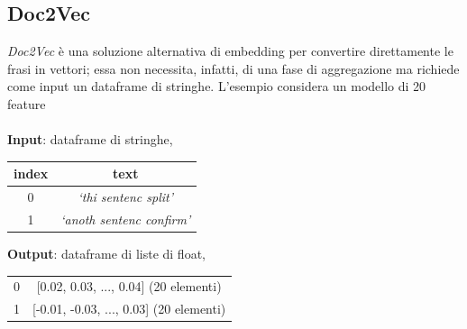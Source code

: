 \documentclass[12pt]{report}
\theoremstyle{definition}
\begin{document}
\subsection{Doc2Vec}
\textit{Doc2Vec} è una soluzione alternativa di embedding per convertire direttamente le frasi in vettori; essa non necessita, infatti, di una fase di aggregazione ma richiede come input un dataframe di stringhe.
L'esempio considera un modello di 20 feature 
\\
\\
\textbf{Input}: dataframe di stringhe,
\begin{center}
    \begin{tabular}{|c|c|}
    \hline
    \textbf{index} & \textbf{text} \\
    \hline
         0 & \textit{`thi sentenc split'}\\
         1 & \textit{`anoth sentenc confirm'}\\
    \hline
    \end{tabular}
\end{center}
\textbf{Output}: dataframe di liste di float,
\begin{center}
    \begin{tabular}{|c|c|}
    \hline
         0 & [0.02, 0.03, ..., 0.04] (20 elementi) \\
         1 & [-0.01, -0.03, ..., 0.03] (20 elementi) \\
    \hline
    \end{tabular}
\end{center}
\end{document}
